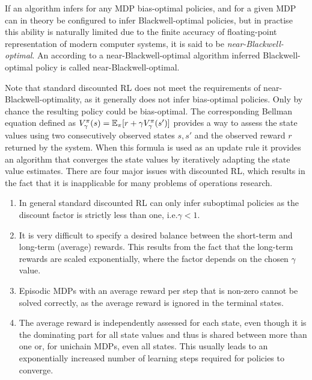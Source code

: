 \documentclass[envcountsame]{llncs}
\begin{document}
\begin{definition}
  If an algorithm infers for any MDP bias-optimal policies, and for a given MDP can in theory be
  configured to infer Blackwell-optimal policies, but in practise this ability is naturally limited
  due to the finite accuracy of floating-point representation of modern computer systems, it is said
  to be \emph{near-Blackwell-optimal}. An according to a near-Blackwell-optimal algorithm inferred
  Blackwell-optimal policy is called near-Blackwell-optimal.
\end{definition}

Note that standard discounted RL does not meet the requirements of near-Blackwell-optimality, as it
generally does not infer bias-optimal policies. Only by chance the resulting policy could be
bias-optimal.
%
%
%
The corresponding Bellman equation defined as
\(V_{\gamma}^{\pi}(s) = \operatorname*{\mathbb{E}}_{\pi}[r + \gamma V_{\gamma}^{\pi}(s')]\) \citep[see
e.g.][p.70]{sutton1998introduction} provides a way to assess the state values using two
consecutively observed states \(s, s'\) and the observed reward \(r\) returned by the system. When
this formula is used as an update rule it provides an algorithm that converges the state values by
iteratively adapting the state value estimates.
%
There are four major issues with discounted RL, which results in the fact that it is inapplicable
for many problems of operations research.


\begin{enumerate}
\item In general standard discounted RL can only infer suboptimal policies as the discount factor is
  strictly less than one, i.e.\@ \(\gamma < 1\).
\item It is very difficult to specify a desired balance between the short-term and long-term
  (average) rewards. This results from the fact that the long-term rewards are scaled exponentially,
  where the factor depends on the chosen \(\gamma\) value.
\item Episodic MDPs with an average reward per step that is non-zero cannot be solved correctly, as
  the average reward is ignored in the terminal states.
\item The average reward is independently assessed for each state, even though it is the dominating
  part for all state values and thus is shared between more than one or, for unichain MDPs, even all
  states. This usually leads to an exponentially increased number of learning steps required for
  policies to converge.
\end{enumerate}
\end{document}
